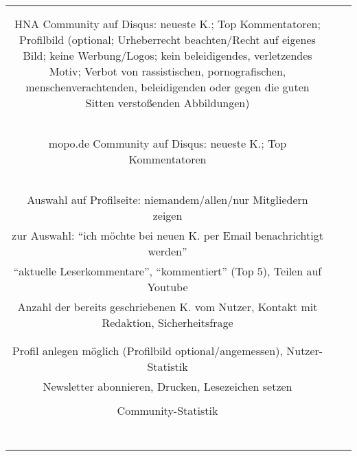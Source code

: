 \begin{landscape}
\begin{tabular}{ccc}
{		&
		\\
		\\
		HNA Community auf Disqus: neueste K.; Top Kommentatoren; Profilbild (optional; Urheberrecht beachten/Recht auf eigenes Bild; keine Werbung/Logos; kein beleidigendes, verletzendes Motiv; Verbot von rassistischen, pornografischen, menschenverachtenden, beleidigenden oder gegen die guten Sitten verstoßenden Abbildungen)\\
		\\
		\\
		\\
		&
		\\
		\\
		mopo.de Community auf Disqus: neueste K.; Top Kommentatoren\\
		\\
		\\
		\\
		&
		\\
		\\
		Auswahl auf Profilseite: niemandem/allen/nur Mitgliedern zeigen\\
		zur Auswahl: ``ich möchte bei neuen K. per Email benachrichtigt werden'' \\
		``aktuelle Leserkommentare'', ``kommentiert'' (Top 5), Teilen auf Youtube\\
		Anzahl der bereits geschriebenen K. vom Nutzer, Kontakt mit Redaktion, Sicherheitsfrage\\
		&
		\\
		\\
		Profil anlegen möglich (Profilbild optional/angemessen), Nutzer-Statistik\\
		Newsletter abonnieren, Drucken, Lesezeichen setzen\\
		\\
		Community-Statistik\\
		&
		\\
		\\
		\\
		\\
		\\
		\\
		&
		
		\\ \hline
		
		


\end{tabular}
\end{landscape}
